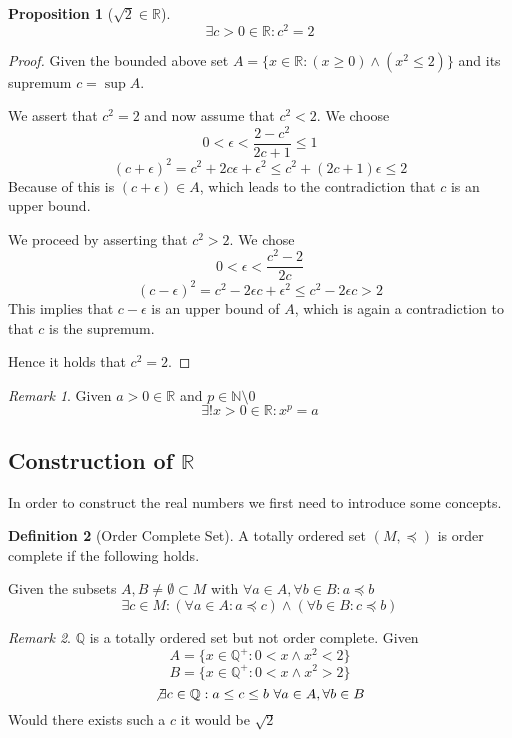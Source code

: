 \documentclass[english,titlepage]{uzhpub}
\theoremstyle{definition}
\newtheorem{definition}{Definition}[section]
\theoremstyle{plain}
\newtheorem{proposition}[definition]{Proposition}
\theoremstyle{remark}
\newtheorem*{remark}{Remark}
\theoremstyle{example}
\begin{document}
   \begin{proposition}[\(\sqrt{2} \in \mathbb{R}\)]
      \[\exists c > 0 \in \mathbb{R}: c^2 = 2\]
   \end{proposition}
   \begin{proof}
      Given the bounded above set \(A = \{x \in \mathbb{R}: (x \geq 0) \land (x^2 \leq 2)\}\) and its supremum \(c = \sup A\).

      We assert that \(c^2 = 2\) and now assume that \(c^2 < 2\).
      We choose
      \[0 < \epsilon < \frac{2 - c^2}{2c + 1} \leq 1\]
      \[(c + \epsilon)^2 = c^2 + 2c\epsilon + \epsilon^2 \leq c^2 + (2c + 1)\epsilon \leq 2\]
      Because of this is \((c + \epsilon) \in A\), which leads to the contradiction that \(c\) is an upper bound.

      We proceed by asserting that \(c^2 > 2\).
      We chose
      \[0 < \epsilon < \frac{c^2 - 2}{2c}\]
      \[(c - \epsilon)^2 = c^2 - 2\epsilon c + \epsilon^2 \leq c^2 - 2\epsilon c > 2\]
      This implies that \(c - \epsilon\) is an upper bound of \(A\), which is again a contradiction to that \(c\) is the supremum.

      Hence it holds that \(c^2 = 2\).
   \end{proof}
   \begin{remark}
      Given \(a > 0 \in \mathbb{R}\) and \(p \in \mathbb{N}\setminus 0\)
      \[\exists! x > 0 \in \mathbb{R}: x^p = a\]
   \end{remark}

   \subsection{Construction of \texorpdfstring{\(\mathbb{R}\)}{R}}
   In order to construct the real numbers we first need to introduce some concepts.

   \begin{definition}[Order Complete Set]
      A totally ordered set \((M, \preceq)\) is order complete if the following holds.

      Given the subsets \(A, B \neq \emptyset \subset M\) with \(\forall a \in A, \forall b \in B: a \preceq b\)
      \[\exists c \in M: (\forall a \in A: a \preceq c) \land (\forall b \in B: c \preceq b)\]
   \end{definition}
   \begin{remark}
      \(\mathbb{Q}\) is a totally ordered set but not order complete. Given
      \[A = \{x \in \mathbb{Q}^+: 0 < x \land x^2 < 2\}\]
      \[B = \{x \in \mathbb{Q}^+: 0 < x \land x^2 > 2\}\]
      \[\not\exists c \in \mathbb{Q}: a \leq c \leq b~\forall a \in A, \forall b \in B\]
      Would there exists such a \(c\) it would be \(\sqrt{2}\)
   \end{remark}
\end{document}
